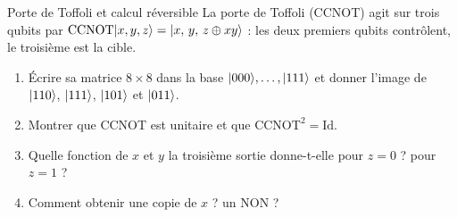 \begin{exercice}{Porte de Toffoli et calcul réversible}\label{ex:toffoli}
La porte de Toffoli (CCNOT) agit sur trois qubits par
$\mathrm{CCNOT}|x,y,z\rangle=|x,\,y,\,z\oplus xy\rangle$ : les deux premiers qubits contrôlent, le
troisième est la cible.
\begin{enumerate}[label=\arabic*.,nosep]
  \item Écrire sa matrice $8\times8$ dans la base $|000\rangle,\dots,|111\rangle$ et donner l'image de
        $|110\rangle$, $|111\rangle$, $|101\rangle$ et $|011\rangle$.
  \item Montrer que CCNOT est unitaire et que $\mathrm{CCNOT}^2=\mathrm{Id}$.
  \item Quelle fonction de $x$ et $y$ la troisième sortie donne-t-elle pour $z=0$ ? pour $z=1$ ?
  \item Comment obtenir une copie de $x$ ? un NON ?
\end{enumerate}
\end{exercice}
